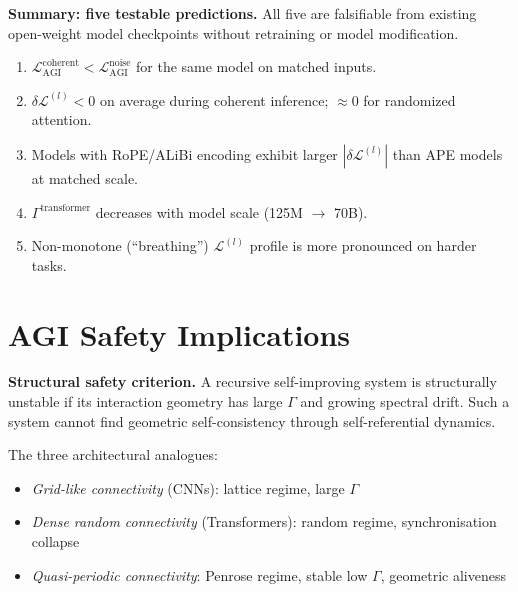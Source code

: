 \documentclass[12pt,a4paper]{article}
\theoremstyle{plain}
\theoremstyle{definition}
\begin{document}
\newpage
\begin{keyresult}
\textbf{Summary: five testable predictions.} All five are falsifiable
from existing open-weight model checkpoints without retraining or model
modification.
\begin{enumerate}[label=(\roman*)]
  \item $\mathcal{L}_{\text{AGI}}^{\text{coherent}} <
        \mathcal{L}_{\text{AGI}}^{\text{noise}}$ for the same model on
        matched inputs.
  \item $\delta\mathcal{L}^{(l)} < 0$ on average during coherent
        inference; $\approx 0$ for randomized attention.
  \item Models with RoPE/ALiBi encoding exhibit larger
        $|\delta\mathcal{L}^{(l)}|$ than APE models at matched scale.
  \item $\Gamma^{\text{transformer}}$ decreases with model scale
        (125M $\to$ 70B).
  \item Non-monotone (``breathing'') $\mathcal{L}^{(l)}$ profile is
        more pronounced on harder tasks.
\end{enumerate}
\end{keyresult}

\section{AGI Safety Implications}
\label{sec:agi}

\begin{keyresult}
\textbf{Structural safety criterion.} A recursive self-improving system
is structurally unstable if its interaction geometry has large $\Gamma$
and growing spectral drift. Such a system cannot find geometric
self-consistency through self-referential dynamics.
\end{keyresult}

The three architectural analogues:
\begin{itemize}
  \item \emph{Grid-like connectivity} (CNNs): lattice regime, large
        $\Gamma$
  \item \emph{Dense random connectivity} (Transformers): random regime,
        synchronisation collapse
  \item \emph{Quasi-periodic connectivity}: Penrose regime, stable low
        $\Gamma$, geometric aliveness
\end{itemize}
\end{document}
